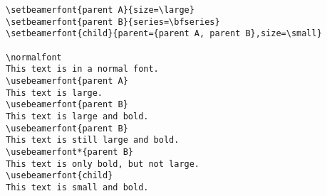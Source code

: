 \begin{command}{\setbeamerfont\opt{|*|}}
  \example
\begin{verbatim}
\setbeamerfont{parent A}{size=\large}
\setbeamerfont{parent B}{series=\bfseries}
\setbeamerfont{child}{parent={parent A, parent B},size=\small}

\normalfont
This text is in a normal font.
\usebeamerfont{parent A}
This text is large.
\usebeamerfont{parent B}
This text is large and bold.
\usebeamerfont{parent B}
This text is still large and bold.
\usebeamerfont*{parent B}
This text is only bold, but not large.
\usebeamerfont{child}
This text is small and bold.
\end{verbatim}
\end{command}




